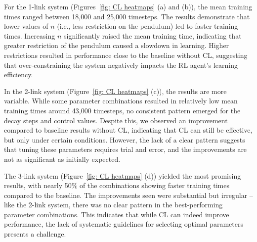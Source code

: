 For the 1-link system (Figures~\ref{fig: CL heatmaps} (a) and (b)), the mean training times ranged between 18,000 and 25,000 timesteps. The results demonstrate that lower values of \(n\) (i.e., less restriction on the pendulum) led to faster training times. Increasing \(n\) significantly raised the mean training time, indicating that greater restriction of the pendulum caused a slowdown in learning. Higher restrictions resulted in performance close to the baseline without CL, suggesting that over-constraining the system negatively impacts the RL agent's learning efficiency.

In the 2-link system (Figure~\ref{fig: CL heatmaps} (c)), the results are more variable. While some parameter combinations resulted in relatively low mean training times around 43,000 timesteps, no consistent pattern emerged for the decay steps and control values. Despite this, we observed an improvement compared to baseline results without CL, indicating that CL can still be effective, but only under certain conditions. However, the lack of a clear pattern suggests that tuning these parameters requires trial and error, and the improvements are not as significant as initially expected.

The 3-link system (Figure~\ref{fig: CL heatmaps} (d)) yielded the most promising results, with nearly 50\% of the combinations showing faster training times compared to the baseline. The improvements seen were substantial but irregular -- like the 2-link system, there was no clear pattern in the best-performing parameter combinations. This indicates that while CL can indeed improve performance, the lack of systematic guidelines for selecting optimal parameters presents a challenge.

